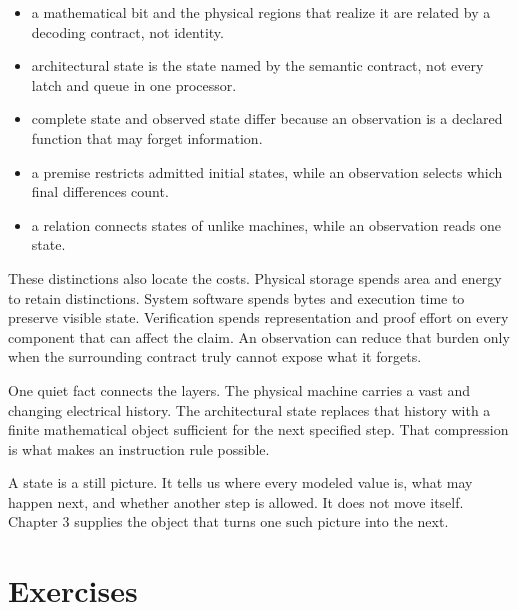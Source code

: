 \begin{itemize}
\item a mathematical bit and the physical regions that realize it are related
      by a decoding contract, not identity.
\item architectural state is the state named by the semantic contract, not
      every latch and queue in one processor.
\item complete state and observed state differ because an observation is a
      declared function that may forget information.
\item a premise restricts admitted initial states, while an observation
      selects which final differences count.
\item a relation connects states of unlike machines, while an observation
      reads one state.
\end{itemize}

These distinctions also locate the costs. Physical storage spends area and
energy to retain distinctions. System software spends bytes and execution
time to preserve visible state. Verification spends representation and proof
effort on every component that can affect the claim. An observation can reduce
that burden only when the surrounding contract truly cannot expose what it
forgets.

One quiet fact connects the layers. The physical machine carries a vast and
changing electrical history. The architectural state replaces that history
with a finite mathematical object sufficient for the next specified step.
That compression is what makes an instruction rule possible.

A state is a still picture. It tells us where every modeled value is, what may
happen next, and whether another step is allowed. It does not move itself.
Chapter 3 supplies the object that turns one such picture into the next.

\section{Exercises}


